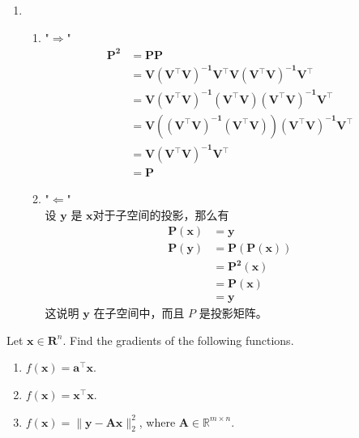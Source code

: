 \documentclass[11pt,letter,notitlepage]{article}
\begin{document}
\begin{solution}
\begin{enumerate}
\begin{enumerate}
			\item \begin{enumerate}
				\item "$\Rightarrow$" \\
				\begin{align*}
					\mathbf{P^2} &= \mathbf{P P}\\
					& = \mathbf{V(V^{\top}V)^{-1}V^{\top}V(V^{\top}V)^{-1}V^{\top}}\\
					& = \mathbf{V(V^{\top}V)^{-1}(V^{\top}V)(V^{\top}V)^{-1}V^{\top}}\\
					& = \mathbf{V((V^{\top}V)^{-1}(V^{\top}V))(V^{\top}V)^{-1}V^{\top}}\\
					& = \mathbf{V(V^{\top}V)^{-1}V^{\top}}\\
					& = \mathbf{P}
				\end{align*}
				\item "$\Leftarrow$" \\
				设 $\mathbf{y}$ 是 $\mathbf{x}$对于子空间的投影，那么有 
				\begin{align*}
					\mathbf{P(x)} & =\mathbf{y}\\
					\mathbf{P(y)} & = \mathbf{P(P(x))}\\
					& = \mathbf{P^2(x)} \\
					& = \mathbf{P(x)}\\
					& = \mathbf{y}
				\end{align*}
				这说明 $\mathbf{y}$ 在子空间中，而且 $P$ 是投影矩阵。
					
			\end{enumerate}
		\end{enumerate}
	\end{enumerate}
\end{solution}

\newpage

\begin{exercise} 
	Let $\mathbf{x}\in \mathbf{R}^n$. Find the gradients of the following functions.
	\begin{enumerate}
	    \item $f(\mathbf{x}) = \mathbf{a}^{\top}\mathbf{x}$.
	    \item $f(\mathbf{x}) = \mathbf{x}^{\top}\mathbf{x}$.
	    \item $f(\mathbf{x})=\| \mathbf{y} - \mathbf{A}\mathbf{x} \|_2^2$, where $\mathbf{A}\in\mathbb{R}^{m\times n}$.
	\end{enumerate}
\end{exercise}
\end{document}

